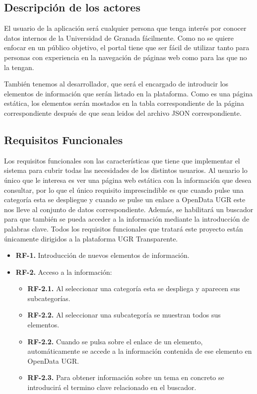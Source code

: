 \subsection{Descripción de los actores}

El usuario de la aplicación será cualquier persona que tenga interés por conocer datos internos de la Universidad de Granada 
fácilmente. Como no se quiere enfocar en un público objetivo, el portal tiene que ser fácil de utilizar tanto para personas 
con experiencia en la navegación de páginas web como para las que no la tengan.

\bigskip
También tenemos al desarrollador, que será el encargado de introducir los elementos de información que serán listado en la
plataforma. Como es una página estática, los elementos serán mostados en la tabla correspondiente de la página correspondiente
después de que sean leidos del archivo JSON correspondiente.

\subsection{Requisitos Funcionales}

Los requisitos funcionales son las características que tiene que implementar el sistema para cubrir todas las necesidades de 
los distintos usuarios. Al usuario lo único que le interesa es ver una página web estática con la información que desea 
consultar, por lo que el único requisito imprescindible es que cuando pulse una categoría esta se despliegue y cuando se 
pulse un enlace a OpenData UGR este nos lleve al conjunto de datos correspondiente. Además, se habilitará un buscador para que
también se pueda acceder a la información mediante la introducción de palabras clave. Todos los requisitos funcionales que 
tratará este proyecto están únicamente dirigidos a la plataforma UGR Transparente.

\begin{itemize}
  \item \textbf{RF-1.} Introducción de nuevos elementos de información.
\end{itemize}

\begin{itemize}
  \item \textbf{RF-2.} Acceso a la información:
  \begin{itemize}
    \item \textbf{RF-2.1.} Al seleccionar una categoría esta se despliega y aparecen sus subcategorías.
    \item \textbf{RF-2.2.} Al seleccionar una subcategoría se muestran todos sus elementos.
    \item \textbf{RF-2.2.} Cuando se pulsa sobre el enlace de un elemento, automáticamente se accede a la información contenida 
    de ese elemento en OpenData UGR.
    \item \textbf{RF-2.3.} Para obtener información sobre un tema en concreto se introducirá el termino clave relacionado en 
    el buscador.
    \end{itemize}
\end{itemize}

